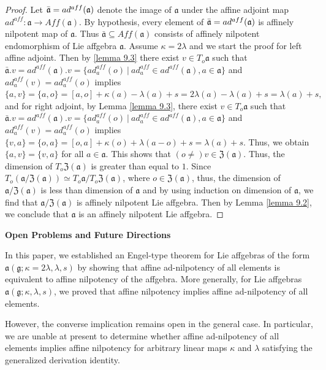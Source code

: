 \documentclass{article}
\theoremstyle{definition}
\theoremstyle{remark}
\theoremstyle{plain}
\begin{document}
\begin{proof}
    Let $\Bar{\mathfrak{a}}=ad^{aff}(\mathfrak{a})$ denote the image of $\mathfrak{a}$ under the affine adjoint map  $ad^{aff}:\mathfrak{a}\rightarrow Aff(\mathfrak{a})$. By hypothesis, every element of $\Bar{\mathfrak{a}}=ad^{aff}(\mathfrak{a})$ is affinely nilpotent map of $\mathfrak{a}$. Thus $\bar{\mathfrak{a}} \subseteq Aff(\mathfrak{a})$ consists of affinely nilpotent endomorphism of Lie affgebra $\mathfrak{a}$. Assume $\kappa=2\lambda$ and we start the proof for left affine adjoint. Then by \ref{lemma 9.3} there exist $v\in T_{o}\mathfrak{a}$ such that $\bar{\mathfrak{a}}. v=ad^{aff}(\mathfrak{a}).v=\{ad^{aff}_{a}(o) ~|~ ad^{aff}_{a} \in ad^{aff}(\mathfrak{a}), a\in \mathfrak{a}\}$ and $ad^{aff}_{a}(v)=ad^{aff}_{a}(o)$ implies $\{a, v\}=\{a, o\}=[a, o]+\kappa(a)-\lambda(a)+s=2\lambda(a)-\lambda(a)+s=\lambda(a)+s,$ and for right adjoint, by Lemma \ref{lemma 9.3}, there exist $v\in T_{o}\mathfrak{a}$ such that $\bar{\mathfrak{a}}. v=ad^{aff}(\mathfrak{a}).v=\{ad^{aff}_{a}(o) ~|~ ad^{aff}_{a} \in ad^{aff}(\mathfrak{a}), a\in \mathfrak{a}\}$ and $ad^{aff}_{a}(v)=ad^{aff}_{a}(o)$ implies $\{v, a\}=\{o, a\}=[o, a]+\kappa(o)+\lambda(a-o)+s=\lambda(a)+s.$ Thus, we obtain $\{a, v\}=\{v, a\}$ for all $a\in \mathfrak{a}$. This shows that $(o\neq)v\in \mathfrak{Z(a)}$. Thus, the dimension of $T_{o}\mathfrak{Z(a)}$ is greater than equal to $1$. Since $T_{o}(\mathfrak{a/Z(a)})\simeq T_{o}\mathfrak{a}/T_{o}\mathfrak{Z(a)}$, where $o\in \mathfrak{Z(a)}$, thus, the dimension of $\mathfrak{a/Z(a)}$ is less than dimension of $\mathfrak{a}$ and by using induction on dimension of $\mathfrak{a}$, we find that $\mathfrak{a/Z(a)}$ is affinely nilpotent Lie affgebra. Then by Lemma \ref{lemma 9.2}, we conclude that $\mathfrak{a}$ is an affinely nilpotent Lie affgebra.    
\end{proof}


\begin{center}{\bf Open Problems and Future Directions}\end{center}

In this paper, we established an Engel-type theorem for Lie affgebras of the form
$\mathfrak{a}(\mathfrak{g};\kappa=2\lambda,\lambda,s)$ by showing that affine ad-nilpotency of all elements
is equivalent to affine nilpotency of the affgebra. More generally, for Lie affgebras
$\mathfrak{a}(\mathfrak{g};\kappa,\lambda,s)$, we proved that affine nilpotency implies
affine ad-nilpotency of all elements.

However, the converse implication remains open in the general case. In particular,
we are unable at present to determine whether affine ad-nilpotency of all elements
implies affine nilpotency for arbitrary linear maps $\kappa$ and $\lambda$ satisfying the generalized derivation identity.
\end{document}
